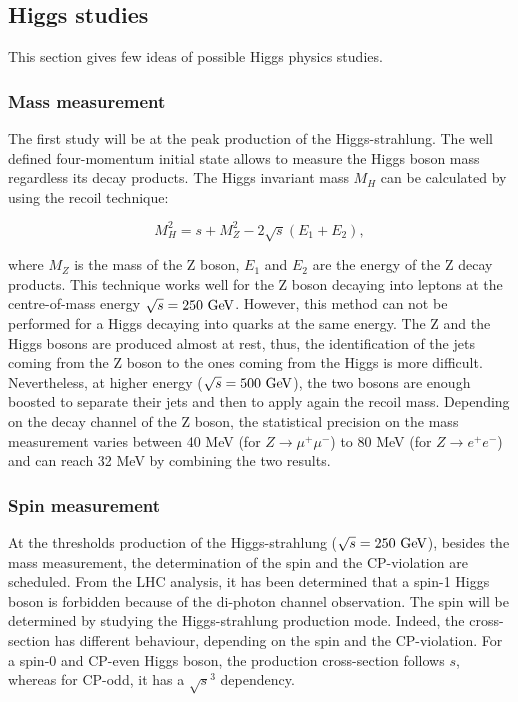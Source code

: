     \subsection{Higgs studies}

    This section gives few ideas of possible Higgs physics studies.

    \subsubsection{Mass measurement}

    The first study will be at the peak production of the Higgs-strahlung. 
    The well defined four-momentum initial state allows to measure the Higgs boson mass regardless its decay products.
    The Higgs invariant mass $M_H$ can be calculated by using the recoil technique:

    \begin{equation}
      M^2_H = s + M^2_Z - 2 \sqrt{s}\left(E_{1} + E_{2}\right),
    \end{equation}

    where $M_Z$ is the mass of the Z boson, $E_1$ and $E_2$ are the energy of the Z decay products. 
    This technique works well for the Z boson decaying into leptons at the centre-of-mass energy $\sqrt{s} = 250~\rm{GeV}$.
    However, this method can not be performed for a Higgs decaying into quarks at the same energy. 
    The Z and the Higgs bosons are produced almost at rest, thus, the identification of the jets coming from the Z boson to the ones coming from the Higgs is more difficult.
    Nevertheless, at higher energy ($\sqrt{s} = 500~\rm{GeV}$), the two bosons are enough boosted to separate their jets and then to apply again the recoil mass.
    Depending on the decay channel of the Z boson, the statistical precision on the mass measurement varies between 40 MeV (for $Z \rightarrow \mu^+\mu^-$) to 80 MeV (for $Z \rightarrow e^+e^-$) and can reach 32 MeV by combining the two results.

    \subsubsection{Spin measurement}

    At the thresholds production of the Higgs-strahlung ($\sqrt{s} = 250~\rm{GeV}$), besides the mass measurement, the determination of the spin and the CP-violation are scheduled.
    From the \gls{LHC} analysis, it has been determined that a spin-1 Higgs boson is forbidden because of the di-photon channel observation\cite{TheATLASCollaboration2013}.
    The spin will be determined by studying the Higgs-strahlung production mode.
    Indeed, the cross-section has different behaviour, depending on the spin and the CP-violation.
    For a spin-0 and CP-even Higgs boson, the production cross-section follows $s$, whereas for CP-odd, it has a $\sqrt{s}^3$ dependency.

